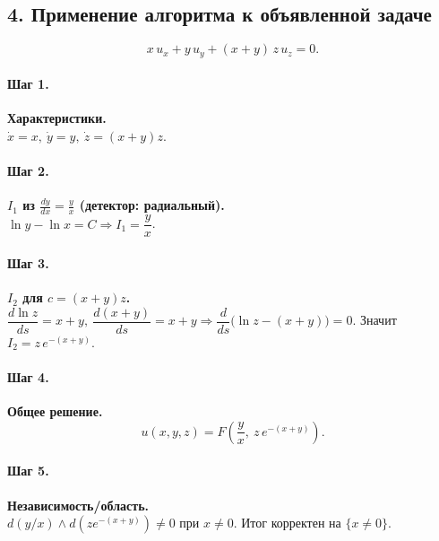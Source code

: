 \subsection*{4. Применение алгоритма к объявленной задаче}

\[
x\,u_x + y\,u_y + (x+y)\,z\,u_z = 0.
\]

\paragraph{Шаг 1.} \textbf{Характеристики.}\\
\(\dot x=x,\ \dot y=y,\ \dot z=(x+y)z\).

\paragraph{Шаг 2.} \textbf{\(I_1\) из \(\frac{dy}{dx}=\frac{y}{x}\) (детектор: радиальный).}\\
\(\ln y-\ln x=C \Rightarrow I_1=\dfrac{y}{x}\).

\paragraph{Шаг 3.} \textbf{\(I_2\) для \(c=(x+y)z\).}\\
\(\dfrac{d\ln z}{ds}=x+y,\ \dfrac{d(x+y)}{ds}=x+y \Rightarrow \dfrac{d}{ds}\big(\ln z-(x+y)\big)=0\).  
Значит \(I_2=z\,e^{-(x+y)}\).

\paragraph{Шаг 4.} \textbf{Общее решение.}\\
\[
u(x,y,z)=F\!\left(\frac{y}{x},\ z\,e^{-(x+y)}\right).
\]

\paragraph{Шаг 5.} \textbf{Независимость/область.}\\
\(d(y/x)\wedge d(z e^{-(x+y)})\neq 0\) при \(x\neq 0\). Итог корректен на \(\{x\neq 0\}\).


